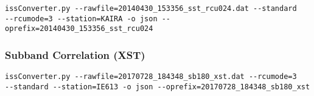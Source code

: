 \documentclass[10pt,a4paper]{article}
\begin{document}
\begin{verbatim}
issConverter.py --rawfile=20140430_153356_sst_rcu024.dat --standard
--rcumode=3 --station=KAIRA -o json --oprefix=20140430_153356_sst_rcu024
\end{verbatim}


\subsubsection{Subband Correlation (XST)}

\begin{verbatim}
issConverter.py --rawfile=20170728_184348_sb180_xst.dat --rcumode=3
--standard --station=IE613 -o json --oprefix=20170728_184348_sb180_xst
\end{verbatim}
\end{document}
